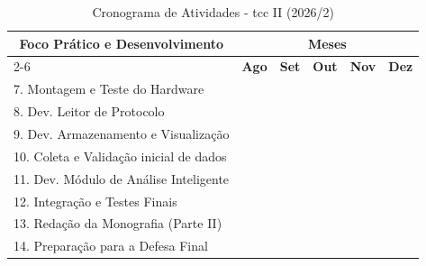 \documentclass[a4paper, 12pt]{article}
\begin{document}
\begin{table}[!ht]
\centering
\caption{Cronograma de Atividades - \acrshort{tcc} II (2026/2)}
\label{tab:cronograma_tcc2}
\begin{tabular}{|l|c|c|c|c|c|}
\hline
\multicolumn{1}{|c|}{\multirow{2}{*}{\textbf{Foco Prático e Desenvolvimento}}} &
\multicolumn{5}{c|}{\textbf{Meses}} \\ \cline{2-6} 
\multicolumn{1}{|c|}{} & \textbf{Ago} & \textbf{Set} & \textbf{Out} & \textbf{Nov} & \textbf{Dez} \\ \hline
7. Montagem e Teste do Hardware & \cellcolor[HTML]{C0C0C0} & & & & \\ \hline
8. Dev. Leitor de Protocolo & \cellcolor[HTML]{C0C0C0} & \cellcolor[HTML]{C0C0C0} & \cellcolor[HTML]{C0C0C0}& & \\ \hline
9. Dev. Armazenamento e Visualização & & \cellcolor[HTML]{C0C0C0} & \cellcolor[HTML]{C0C0C0} & & \\ \hline
10. Coleta e Validação inicial de dados & & \cellcolor[HTML]{C0C0C0} & \cellcolor[HTML]{C0C0C0} & & \\ \hline
11. Dev. Módulo de Análise Inteligente & & & \cellcolor[HTML]{C0C0C0} & \cellcolor[HTML]{C0C0C0} & \\ \hline
12. Integração e Testes Finais & & & &  \cellcolor[HTML]{C0C0C0} & \cellcolor[HTML]{C0C0C0} \\ \hline
13. Redação da Monografia (Parte II) & \cellcolor[HTML]{C0C0C0} & \cellcolor[HTML]{C0C0C0} & \cellcolor[HTML]{C0C0C0} & \cellcolor[HTML]{C0C0C0} & \cellcolor[HTML]{C0C0C0} \\ \hline
14. Preparação para a Defesa Final & & & & &  \cellcolor[HTML]{C0C0C0} \\ \hline
\end{tabular}
\end{table}
\clearpage
{}
\end{document}
